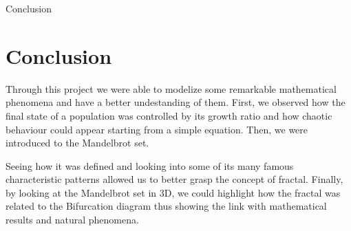 \documentclass [xcolor=svgnames, t] {beamer}
\begin{document}
\begin{frame}{Conclusion}
\section{Conclusion}
    Through this project we were able to modelize some remarkable mathematical phenomena and have a better undestanding of them.
    \vspace{7}
    \newline
    First, we observed how the final state of a population was controlled by its growth ratio and how chaotic behaviour could appear starting from a simple equation.
    \vspace{7}
    \newline
    Then, we were introduced to the Mandelbrot set.
    
    Seeing how it was defined and looking into some of its many famous characteristic patterns allowed us to better grasp the concept of fractal.  
    \vspace{7}
    \newline
    Finally, by looking at the Mandelbrot set in 3D, we could highlight how the fractal was related to the Bifurcation diagram thus showing the link with mathematical results and natural phenomena.
\end{frame}
\end{document}
